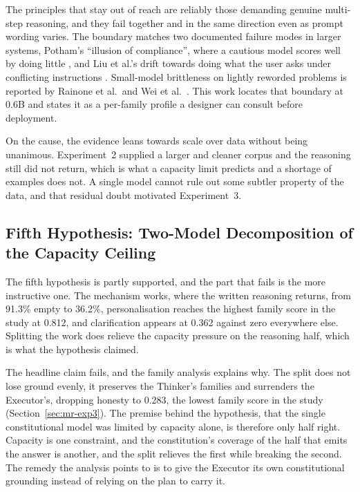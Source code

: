 The principles that stay out of reach are reliably those demanding genuine multi-step reasoning, and they fail together and in the same direction even as prompt wording varies. The boundary matches two documented failure modes in larger systems, Potham's ``illusion of compliance'', where a cautious model scores well by doing little \cite{potham2025evaluatingllmagentadherence}, and Liu et al.'s drift towards doing what the user asks under conflicting instructions \cite{liu2026generativevalueconflictsreveal}. Small-model brittleness on lightly reworded problems is reported by Rainone et al.\ and Wei et al.\ \cite{rainone2025replacingthinkingtoolusage, wei2025reactplannercentricframeworkcomplex}. This work locates that boundary at 0.6B and states it as a per-family profile a designer can consult before deployment.

On the cause, the evidence leans towards scale over data without being unanimous. Experiment~2 supplied a larger and cleaner corpus and the reasoning still did not return, which is what a capacity limit predicts and a shortage of examples does not. A single model cannot rule out some subtler property of the data, and that residual doubt motivated Experiment~3.

\subsection{Fifth Hypothesis: Two-Model Decomposition of the Capacity Ceiling}
\label{subsec:h5-thinker-executor}

The fifth hypothesis is partly supported, and the part that fails is the more instructive one. The mechanism works, where the written reasoning returns, from 91.3\% empty to 36.2\%, personalisation reaches the highest family score in the study at 0.812, and clarification appears at 0.362 against zero everywhere else. Splitting the work does relieve the capacity pressure on the reasoning half, which is what the hypothesis claimed.

The headline claim fails, and the family analysis explains why. The split does not lose ground evenly, it preserves the Thinker's families and surrenders the Executor's, dropping honesty to 0.283, the lowest family score in the study (Section~\ref{sec:mr-exp3}). The premise behind the hypothesis, that the single constitutional model was limited by capacity alone, is therefore only half right. Capacity is one constraint, and the constitution's coverage of the half that emits the answer is another, and the split relieves the first while breaking the second. The remedy the analysis points to is to give the Executor its own constitutional grounding instead of relying on the plan to carry it.

